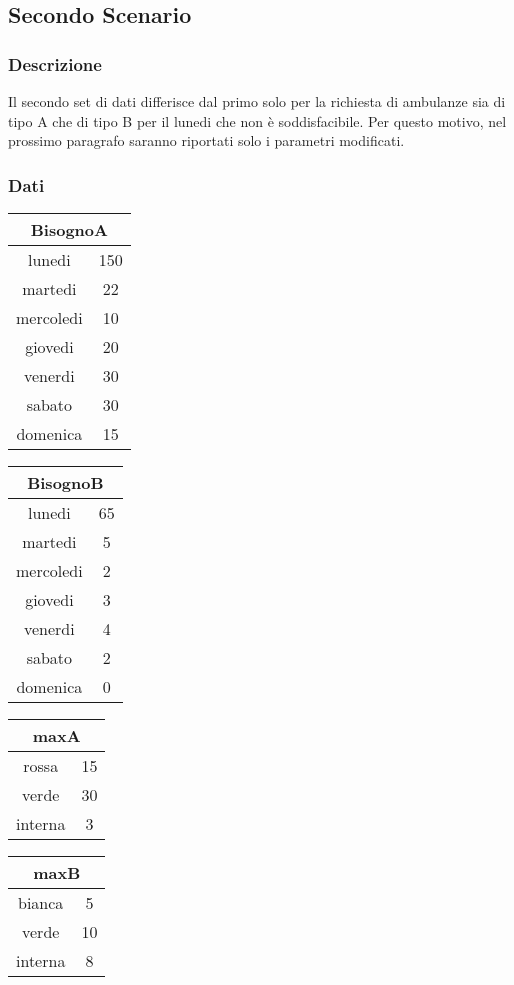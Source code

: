 \subsection{Secondo Scenario}
\subsubsection{Descrizione}
Il secondo set di dati differisce dal primo solo per la richiesta di ambulanze sia di tipo A che di tipo B per il lunedi che non è soddisfacibile. Per questo motivo, nel prossimo paragrafo saranno riportati solo i parametri modificati.
\subsubsection{Dati}
\begin{tabular}{| c | c |}
    \hline
    \multicolumn{2}{|c|}{BisognoA}\\
    \hline \hline
    lunedi & 150 \\
    martedi & 22 \\
    mercoledi & 10 \\
    giovedi & 20 \\
    venerdi & 30 \\
    sabato & 30 \\
    domenica & 15 \\
    \hline
\end{tabular}
\begin{tabular}{| c | c |}
    \hline
    \multicolumn{2}{|c|}{BisognoB}\\
    \hline \hline
    lunedi & 65 \\
    martedi & 5 \\
    mercoledi & 2 \\
    giovedi & 3 \\
    venerdi & 4 \\
    sabato & 2 \\
    domenica & 0 \\
    \hline
\end{tabular}
\begin{tabular}{| c | c |}
    \hline
    \multicolumn{2}{|c|}{maxA}\\
    \hline \hline
    rossa & 15 \\
    verde & 30 \\
    interna & 3 \\
    \hline    
\end{tabular}
\begin{tabular}{| c | c |}
    \hline
    \multicolumn{2}{|c|}{maxB} \\
    \hline \hline
    bianca & 5 \\
    verde & 10 \\
    interna & 8 \\
    \hline    
\end{tabular}

